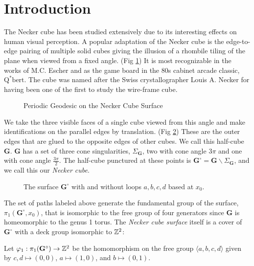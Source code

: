 \documentclass[a4paper, 11pt]{article}
\def\bG{\mathbf{G}} \def\bGs{\mathbf{G}^\circ}
\def\<{\langle} \def\>{\rangle}
\begin{document}
\section{Introduction}
The Necker cube has been studied extensively due to its interesting effects on human visual perception. A popular adaptation of the Necker cube is the edge-to-edge pairing of multiple solid cubes giving the illusion of a rhombile tiling of the plane when viewed from a fixed angle. (Fig \ref{fig:front}) It is most recognizable in the works of M.C. Escher \cite{Escher1}\cite{Escher2} and as the game board in the 80s cabinet arcade classic, $\text{Q}^*\text{bert}$.\cite{Qbert} The cube was named after the Swiss crystallographer Louis A. Necker for having been one of the first to study the wire-frame cube.\cite{Albert}
\begin{figure}[H]
\centering

\caption{Periodic Geodesic on the Necker Cube Surface}
\label{fig:front}
\end{figure}
We take the three visible faces of a single cube viewed from this angle and make identifications on the parallel edges by translation. (Fig \ref{fig:halfcube}) These are the outer edges that are glued to the opposite edges of other cubes. We call this half-cube $\bG$. $\bG$ has a set of three cone singularities, $\Sigma_\bG$, two with cone angle $3\pi$ and one with cone angle $\frac{3\pi}{2}$. The half-cube punctured at these points is $\bGs=\bG\backslash\Sigma_\bG$, and we call this our \emph{Necker cube}.
\begin{figure}[H]
\centering

\caption{The surface $\bGs$ with and without loops $a,b,c,d$ based at $x_0$.}
\label{fig:halfcube}
\end{figure}
The set of paths labeled above generate the fundamental group of the surface, $\pi_1(\bGs,x_0)$, that is isomorphic to the free group of four generators since $\bG$ is homeomorphic to the genus 1 torus. The \emph{Necker cube surface} itself is a cover of $\bGs$ with a deck group isomorphic to $\mathbb{Z}^2$:

\begin{figure}[H]
\centering

\end{figure}

\begin{Def}
Let $\varphi_1:\pi_1(\bGs)\rightarrow \ZZ^2$ be the homomorphism on the free group $\<a,b,c,d\>$ given by $c,d\mapsto(0,0)$, $a\mapsto(1,0)$, and $b\mapsto(0,1)$.
\end{Def}
\end{document}

